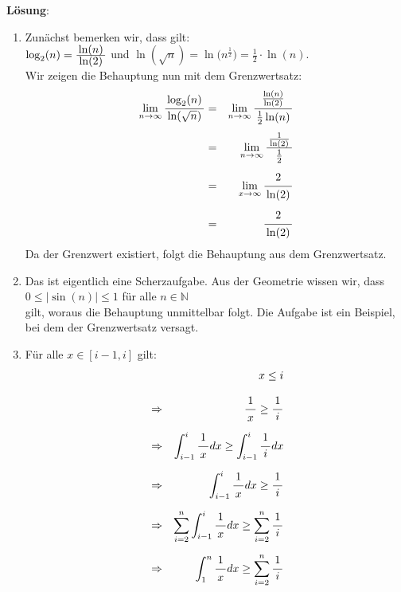 \documentclass{article}
\newcommand{\bruch}[2]{\frac{\displaystyle \raisebox{1pt}[0pt][-0pt]{$\,#1\,$}}{\displaystyle \raisebox{0pt}[9pt]{$\,#2\,$}}}
\begin{document}
\textbf{L\"osung}:
\begin{enumerate}
\item Zun\"achst bemerken wir, dass gilt:
      \\[0.2cm]
      \hspace*{1.3cm}
      $\log_2(n) = \bruch{\ln(n)}{\ln(2)}$ \quad und \quad
      $\ln(\sqrt{n}) = \ln\bigl(n^\frac{1}{2}\bigr) = \frac{1}{2} \cdot \ln(n)$.
      \\[0.2cm]
      Wir zeigen die Behauptung nun mit dem Grenzwertsatz:
      \begin{eqnarray*}
              \lim\limits_{n \rightarrow \infty} \bruch{\log_2(n)}{\ln(\sqrt{n})}
        & = & \lim\limits_{n \rightarrow \infty} \bruch{\frac{\ln(n)}{\ln(2)}}{\frac{1}{2}\ln(n)} \\[0.4cm]
        & = & \lim\limits_{n \rightarrow \infty} \bruch{\frac{1}{\ln(2)}}{\frac{1}{2}} \\[0.2cm]
        & = & \lim\limits_{x \rightarrow \infty} \bruch{2}{\ln(2)} \\[0.2cm]
        & = & \bruch{2}{\ln(2)} 
      \end{eqnarray*}
      Da der Grenzwert existiert, folgt die Behauptung aus dem Grenzwertsatz.
\item Das ist eigentlich eine Scherzaufgabe.  Aus der Geometrie wissen wir, dass 
      \\[0.2cm]
      \hspace*{1.3cm}
      $0 \leq | \sin(n) | \leq 1$ \quad f\"ur alle $n \in \mathbb{N}$ 
      \\[0.2cm]
      gilt, woraus die Behauptung unmittelbar folgt.  Die Aufgabe ist ein Beispiel, bei dem
      der Grenzwertsatz versagt.
\item F\"ur alle $x \in [i-1,i]$ gilt:
      \begin{eqnarray*}
      &             & x \leq i \\[0.3cm]
      & \Rightarrow & \bruch{1}{x} \geq \bruch{1}{i} \\[0.2cm]
      & \Rightarrow & \int_{i-1}^i \bruch{1}{x} dx \geq \int_{i-1}^i \bruch{1}{i} dx \\[0.2cm]
      & \Rightarrow & \int_{i-1}^i \bruch{1}{x} dx \geq \bruch{1}{i} \\[0.2cm]
      & \Rightarrow & \sum\limits_{i=2}^{n} \int_{i-1}^i \bruch{1}{x} dx \geq 
                      \sum\limits_{i=2}^{n} \bruch{1}{i}                      \\[0.2cm]
      & \Rightarrow & \int_{1}^n \bruch{1}{x} dx \geq \sum\limits_{i=2}^{n} \bruch{1}{i} \\[0.2cm]

\end{eqnarray*}
\end{enumerate}
\end{document}
